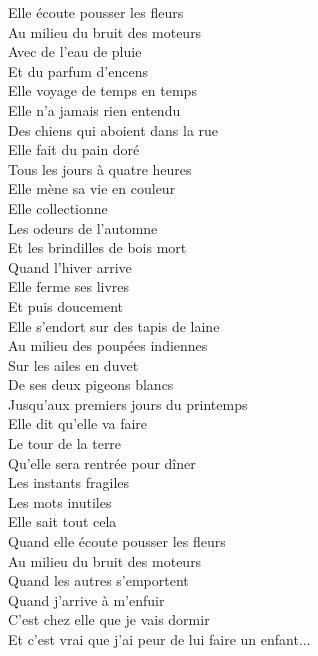 \documentclass{novel}
\begin{document}
\begin{multicols}{2}
Elle écoute pousser les fleurs \\
Au milieu du bruit des moteurs \\
Avec de l'eau de pluie \\
Et du parfum d'encens \\
Elle voyage de temps en temps \\
Elle n'a jamais rien entendu \\
Des chiens qui aboient dans la rue \\
Elle fait du pain doré \\
Tous les jours à quatre heures \\
Elle mène sa vie en couleur \\

Elle collectionne \\
Les odeurs de l'automne \\
Et les brindilles de bois mort \\
Quand l'hiver arrive \\
Elle ferme ses livres \\

Et puis doucement \\
Elle s'endort sur des tapis de laine \\
Au milieu des poupées indiennes \\
Sur les ailes en duvet \\
De ses deux pigeons blancs \\
Jusqu'aux premiers jours du printemps \\

Elle dit qu'elle va faire \\
Le tour de la terre \\
Qu'elle sera rentrée pour dîner \\
Les instants fragiles \\
Les mots inutiles \\

Elle sait tout cela \\
Quand elle écoute pousser les fleurs \\
Au milieu du bruit des moteurs \\
Quand les autres s'emportent \\
Quand j'arrive à m'enfuir \\
C'est chez elle que je vais dormir \\

Et c'est vrai que j'ai peur de lui faire un enfant... \\
\end{multicols}
\end{document}
